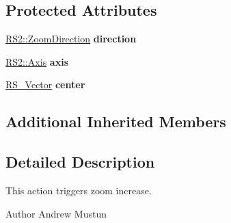 \subsection*{Protected Attributes}
\begin{DoxyCompactItemize}
\item 
\hypertarget{classRS__ActionZoomIn_a41fd5529cab6499d46b18ed07d540032}{\hyperlink{classRS2_a7416f66b1968e3ccb9b70b8f48bac8df}{R\-S2\-::\-Zoom\-Direction} {\bfseries direction}}\label{classRS__ActionZoomIn_a41fd5529cab6499d46b18ed07d540032}

\item 
\hypertarget{classRS__ActionZoomIn_a987646988c7afaeb5572cd725e8a116c}{\hyperlink{classRS2_aba103dd97e4a9cea520151de742d9904}{R\-S2\-::\-Axis} {\bfseries axis}}\label{classRS__ActionZoomIn_a987646988c7afaeb5572cd725e8a116c}

\item 
\hypertarget{classRS__ActionZoomIn_a410d29294ab937682afba6c04140de13}{\hyperlink{classRS__Vector}{R\-S\-\_\-\-Vector} {\bfseries center}}\label{classRS__ActionZoomIn_a410d29294ab937682afba6c04140de13}

\end{DoxyCompactItemize}
\subsection*{Additional Inherited Members}


\subsection{Detailed Description}
This action triggers zoom increase.

\begin{DoxyAuthor}{Author}
Andrew Mustun 
\end{DoxyAuthor}


